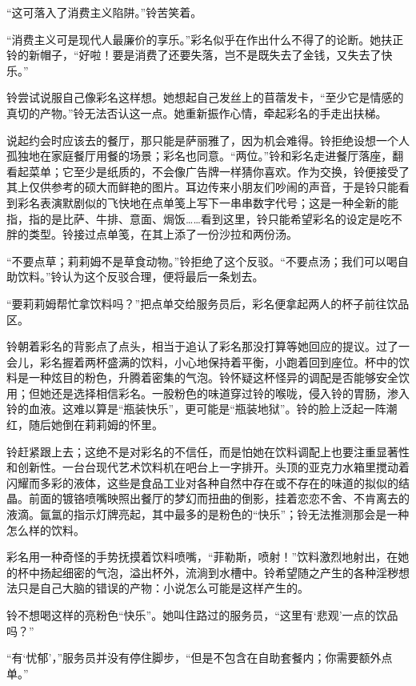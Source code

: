 “这可落入了消费主义陷阱。”铃苦笑着。

“消费主义可是现代人最廉价的享乐。”彩名似乎在作出什么不得了的论断。她扶正铃的新帽子，“好啦！要是消费了还要失落，岂不是既失去了金钱，又失去了快乐。”

铃尝试说服自己像彩名这样想。她想起自己发丝上的苜蓿发卡，“至少它是情感的真切的产物。”铃无法否认这一点。她重新振作心情，牵起彩名的手走出扶梯。

说起约会时应该去的餐厅，那只能是萨丽雅了，因为机会难得。铃拒绝设想一个人孤独地在家庭餐厅用餐的场景；彩名也同意。“两位。”铃和彩名走进餐厅落座，翻看起菜单；它至少是纸质的，不会像广告牌一样猜你喜欢。作为交换，铃便接受了其上仅供参考的硕大而鲜艳的图片。耳边传来小朋友们吵闹的声音，于是铃只能看到彩名表演默剧似的飞快地在点单笺上写下一串串数字代号；这是一种全新的能指，指的是比萨、牛排、意面、焗饭……看到这里，铃只能希望彩名的设定是吃不胖的类型。铃接过点单笺，在其上添了一份沙拉和两份汤。

“不要点草；莉莉姆不是草食动物。”铃拒绝了这个反驳。“不要点汤；我们可以喝自助饮料。”铃认为这个反驳合理，便将最后一条划去。

“要莉莉姆帮忙拿饮料吗？”把点单交给服务员后，彩名便拿起两人的杯子前往饮品区。

\begin{branch}
\gutend 铃朝着彩名的背影点了点头，相当于追认了彩名那没打算等她回应的提议。过了一会儿，彩名握着两杯盛满的饮料，小心地保持着平衡，小跑着回到座位。杯中的饮料是一种炫目的粉色，升腾着密集的气泡。铃怀疑这杯怪异的调配是否能够安全饮用；但她还是选择相信彩名。一股粉色的味道穿过铃的喉咙，侵入铃的胃肠，渗入铃的血液。这难以算是“瓶装快乐”，更可能是“瓶装地狱”。铃的脸上泛起一阵潮红，随后她倒在莉莉姆的怀里。
\end{branch}

铃赶紧跟上去；这绝不是对彩名的不信任，而是怕她在饮料调配上也要注重显著性和创新性。一台台现代艺术饮料机在吧台上一字排开。头顶的亚克力水箱里搅动着闪耀而多彩的液体，这些是食品工业对各种自然中存在或不存在的味道的拟似的结晶。前面的镀铬喷嘴映照出餐厅的梦幻而扭曲的倒影，挂着恋恋不舍、不肯离去的液滴。氤氲的指示灯牌亮起，其中最多的是粉色的“快乐”；铃无法推测那会是一种怎么样的饮料。

彩名用一种奇怪的手势抚摸着饮料喷嘴，“菲勒斯，喷射！”饮料激烈地射出，在她的杯中扬起细密的气泡，溢出杯外，流淌到水槽中。铃希望随之产生的各种淫秽想法只是自己大脑的错误的产物：小说怎么可能是这样产生的。

铃不想喝这样的亮粉色“快乐”。她叫住路过的服务员，“这里有‘悲观’一点的饮品吗？”

“有‘忧郁’，”服务员并没有停住脚步，“但是不包含在自助套餐内；你需要额外点单。”


